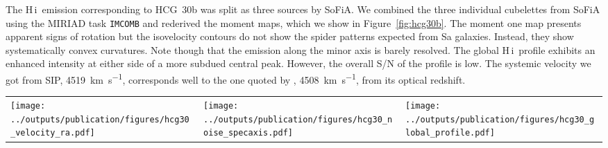 \documentclass{aa}
\newcommand{\HI}{H\,{\sc i}}
\begin{document}
The \HI\ emission corresponding to HCG~30b was split as three sources by SoFiA. We combined the three 
individual cubelettes from SoFiA using the MIRIAD task \texttt{IMCOMB} and rederived the moment maps, which we show in Figure~\ref{fig:hcg30b}. The moment one 
map presents apparent signs of rotation but the isovelocity contours do not show the spider patterns expected from Sa galaxies. Instead, they show systematically convex 
curvatures. Note though that the emission along the minor axis is barely resolved. The global \HI\ profile exhibits an enhanced intensity at either side of a more subdued 
central peak. However, the overall S/N of the profile is low.  The systemic velocity we got from SIP, \qty{4519}{km~s^{-1}}, corresponds well to the one quoted by \citet{2023A&A...670A..21J}, \qty{4508}{km~s^{-1}}, 
from its optical redshift. 
 
\begin{figure*}
\setlength{\tabcolsep}{0pt}
\begin{tabular}{l l l}
    \texttt{[image: ../outputs/publication/figures/hcg30\_velocity\_ra.pdf]} &
    \texttt{[image: ../outputs/publication/figures/hcg30\_noise\_specaxis.pdf]} &
    \texttt{[image: ../outputs/publication/figures/hcg30\_global\_profile.pdf]}
  \end{tabular}
  \caption{Left panel: velocity vs right ascension of HCG~30. Middle panel: median noise values of each RA-DEC slice of the non-primary beam corrected \SI{60}{\arcsecond} data cube of 
  HCG~30 as a function of velocity. The horizontal dashed line indicates the median of all the noise values from each slice. Right panel: the blue solid lines indicates the 
  MeerKAT integrated spectrum of HCG~30; the red solid line indicates VLA integrated spectrum of the group derived by \citep{2023A&A...670A..21J}. 
  The vertical dotted lines indicate the velocities of the galaxies in the core of the group. The spectra have been extracted from areas containing only genuine \HI\ emission. }
  \label{fig:hcg30_noise}
\end{figure*}
\end{document}
